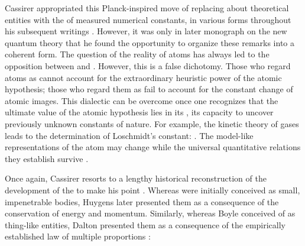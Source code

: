 \documentclass[submitted,12pt]{article}
\begin{document}
Cassirer appropriated this Planck-inspired move of replacing  about theoretical entities with the  of measured numerical constants, in various forms throughout his subsequent writings . However, it was only in  later monograph on the new quantum theory that he found the opportunity to organize these remarks into a coherent form. The question of the reality of atoms has always led to the opposition between  and . However, this is a false dichotomy. Those who regard atoms as  cannot account for the extraordinary heuristic power of the atomic hypothesis; those who regard them as  fail to account for the constant change of atomic images. This dialectic can be overcome once one recognizes that the ultimate value of the atomic hypothesis lies in its , its capacity to uncover previously unknown constants of nature. For example, the kinetic theory of gases leads to the determination of Loschmidt's constant:  . The model-like representations of the atom may change while the universal quantitative relations they establish survive . 

Once again, Cassirer resorts to a lengthy historical reconstruction of the development of the  to make his point \citep[chap.~IV.2]{Cassirer1936}. Whereas  were initially conceived as small, impenetrable bodies, Huygens later presented them as a consequence of the conservation of energy and momentum. Similarly, whereas Boyle conceived of  as thing-like entities, Dalton presented them as a consequence of the empirically established law of multiple proportions :
\end{document}

